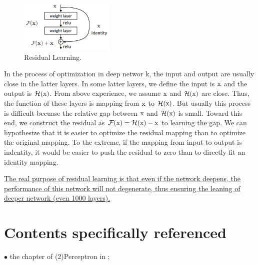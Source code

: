 \documentclass[10pt,onecolumn]{book}
\begin{document}
\begin{figure}[h]
\centering
\includegraphics[width=0.4\textwidth]{figures/residual_learning_block.png}
\caption{Residual Learning.}
\end{figure}

In the process of optimization in deep networ
k, the input and output are usually close in the latter layers. In some latter layers, we define the input is $\rm{x}$ and the output is $\mathcal{H(\rm{x})}$. From above experience, we assume $\rm{x}$ and $\mathcal{H(\rm{x})}$ are close. Thus, the function of these layers is mapping from $\rm{x}$ to $\mathcal{H(\rm{x})}$. But usually this process is difficult becuase the relative gap between $\rm{x}$ and $\mathcal{H(\rm{x})}$ is small. Toward this end, we construct the residual as \uline{$\mathcal{F(\rm{x})} = \mathcal{H(\rm{x})} - \rm{x}$} to learning the gap. We can hypothesize that it is easier to optimize the residual mapping than to optimize the original mapping. To the extreme, if the mapping from input to output is indentity, it would be easier to push the residual to zero than to directly fit an identity mapping.

\uline{The real purpose of residual learning is that even if the network deepens, the performance of this network will not degenerate, thus ensuring the leaning of deeper network (even 1000 layers).}

\chapter{Contents specifically referenced}
$\bullet$ the chapter of (2)Perceptron in \cite{hangli2012};

{\small


}
\end{document}
